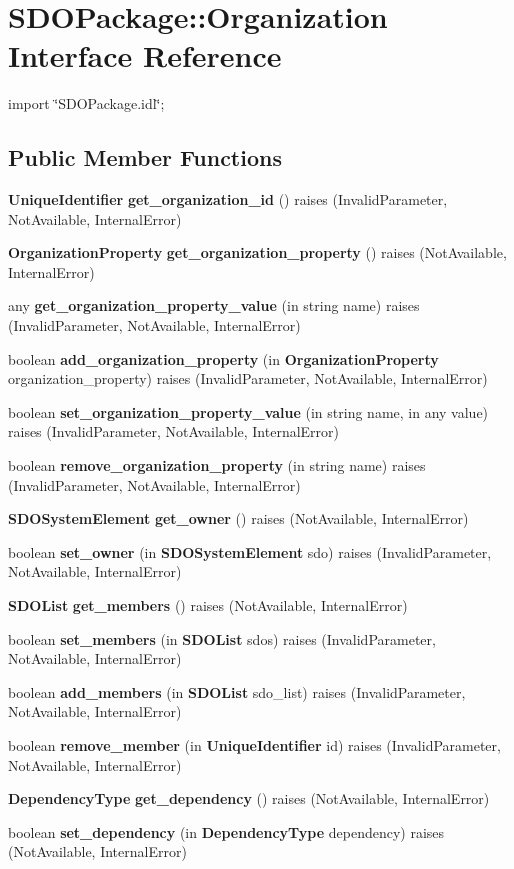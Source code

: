 \section{SDOPackage::Organization Interface Reference}
\label{interfaceSDOPackage_1_1Organization}


{\ttfamily import \char`\"{}SDOPackage.idl\char`\"{};}

\subsection*{Public Member Functions}
\begin{DoxyCompactItemize}
\item 
{\bf UniqueIdentifier} {\bf get\_\-organization\_\-id} ()  raises (InvalidParameter, NotAvailable, InternalError)
\item 
{\bf OrganizationProperty} {\bf get\_\-organization\_\-property} ()  raises (NotAvailable, InternalError)
\item 
any {\bf get\_\-organization\_\-property\_\-value} (in string name)  raises (InvalidParameter, NotAvailable, InternalError)
\item 
boolean {\bf add\_\-organization\_\-property} (in {\bf OrganizationProperty} organization\_\-property)  raises (InvalidParameter, NotAvailable, InternalError)
\item 
boolean {\bf set\_\-organization\_\-property\_\-value} (in string name, in any value)  raises (InvalidParameter, NotAvailable, InternalError)
\item 
boolean {\bf remove\_\-organization\_\-property} (in string name)  raises (InvalidParameter, NotAvailable, InternalError)
\item 
{\bf SDOSystemElement} {\bf get\_\-owner} ()  raises (NotAvailable, InternalError)
\item 
boolean {\bf set\_\-owner} (in {\bf SDOSystemElement} sdo)  raises (InvalidParameter, NotAvailable, InternalError)
\item 
{\bf SDOList} {\bf get\_\-members} ()  raises (NotAvailable, InternalError)
\item 
boolean {\bf set\_\-members} (in {\bf SDOList} sdos)  raises (InvalidParameter, NotAvailable, InternalError)
\item 
boolean {\bf add\_\-members} (in {\bf SDOList} sdo\_\-list)  raises (InvalidParameter, NotAvailable, InternalError)
\item 
boolean {\bf remove\_\-member} (in {\bf UniqueIdentifier} id)  raises (InvalidParameter, NotAvailable, InternalError)
\item 
{\bf DependencyType} {\bf get\_\-dependency} ()  raises (NotAvailable, InternalError)
\item 
boolean {\bf set\_\-dependency} (in {\bf DependencyType} dependency)  raises (NotAvailable, InternalError)
\end{DoxyCompactItemize}


